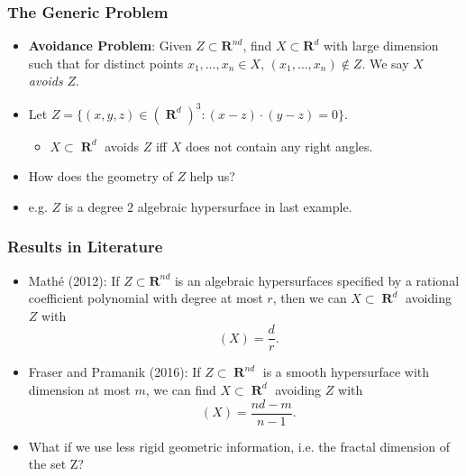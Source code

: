 \documentclass[usenames,dvipsnames]{beamer}
\DeclareMathOperator{\RR}{\textbf{R}}
\DeclareMathOperator{\QQ}{\textbf{Q}}
\DeclareMathOperator{\ZZ}{\textbf{Z}}
\DeclareMathOperator{\hausdim}{\text{dim}_{\textbf{H}}}
\begin{document}
\begin{frame}
    \frametitle{The Generic Problem}

    \begin{itemize}
        \item {\bf Avoidance Problem}: Given $Z \subset \mathbf{R}^{nd}$, find $X \subset \mathbf{R}^d$ with large dimension such that for distinct points $x_1, \dots, x_n \in X$, $(x_1, \dots, x_n) \not \in Z$. We say $X$ \emph{avoids} $Z$.

        \pause
        \item Let $Z = \{ (x,y,z) \in (\RR^d)^3: (x - z) \cdot (y - z) = 0 \}$.
        \begin{itemize}
            \item $X \subset \RR^d$ avoids $Z$ iff $X$ does not contain any right angles.
        \end{itemize}


        \pause
        \item How does the geometry of $Z$ help us?

        \pause
        \item e.g. $Z$ is a degree $2$ algebraic hypersurface in last example.
    \end{itemize}
\end{frame}




\begin{frame}
    \frametitle{Results in Literature}

    \begin{itemize}
        \pause
        \item Math\'{e} (2012): If $Z \subset \mathbf{R}^{nd}$ is an algebraic hypersurfaces specified by a rational coefficient polynomial with degree at most $r$, then we can $X \subset \RR^d$ avoiding $Z$ with
        \[ \hausdim(X) = \frac{d}{r}. \]

        \pause
        \item Fraser and Pramanik (2016): If $Z \subset \RR^{nd}$ is a smooth hypersurface with dimension at most $m$, we can find $X \subset \RR^d$ avoiding $Z$ with
        \[ \hausdim(X) = \frac{nd-m}{n-1}. \]

        \pause
        \item What if we use less rigid geometric information, i.e. the fractal dimension of the set Z?
    \end{itemize}
\end{frame}
\end{document}
